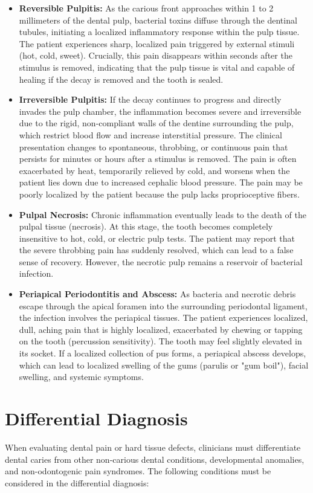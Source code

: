 \begin{itemize}
    \item \textbf{Reversible Pulpitis:} As the carious front approaches within 1 to 2 millimeters of the dental pulp, bacterial toxins diffuse through the dentinal tubules, initiating a localized inflammatory response within the pulp tissue. The patient experiences sharp, localized pain triggered by external stimuli (hot, cold, sweet). Crucially, this pain disappears within seconds after the stimulus is removed, indicating that the pulp tissue is vital and capable of healing if the decay is removed and the tooth is sealed.
    \item \textbf{Irreversible Pulpitis:} If the decay continues to progress and directly invades the pulp chamber, the inflammation becomes severe and irreversible due to the rigid, non-compliant walls of the dentine surrounding the pulp, which restrict blood flow and increase interstitial pressure. The clinical presentation changes to spontaneous, throbbing, or continuous pain that persists for minutes or hours after a stimulus is removed. The pain is often exacerbated by heat, temporarily relieved by cold, and worsens when the patient lies down due to increased cephalic blood pressure. The pain may be poorly localized by the patient because the pulp lacks proprioceptive fibers.
    \item \textbf{Pulpal Necrosis:} Chronic inflammation eventually leads to the death of the pulpal tissue (necrosis). At this stage, the tooth becomes completely insensitive to hot, cold, or electric pulp tests. The patient may report that the severe throbbing pain has suddenly resolved, which can lead to a false sense of recovery. However, the necrotic pulp remains a reservoir of bacterial infection.
    \item \textbf{Periapical Periodontitis and Abscess:} As bacteria and necrotic debris escape through the apical foramen into the surrounding periodontal ligament, the infection involves the periapical tissues. The patient experiences localized, dull, aching pain that is highly localized, exacerbated by chewing or tapping on the tooth (percussion sensitivity). The tooth may feel slightly elevated in its socket. If a localized collection of pus forms, a periapical abscess develops, which can lead to localized swelling of the gums (parulis or "gum boil"), facial swelling, and systemic symptoms.
\end{itemize}

\section*{Differential Diagnosis}
When evaluating dental pain or hard tissue defects, clinicians must differentiate dental caries from other non-carious dental conditions, developmental anomalies, and non-odontogenic pain syndromes. The following conditions must be considered in the differential diagnosis:

